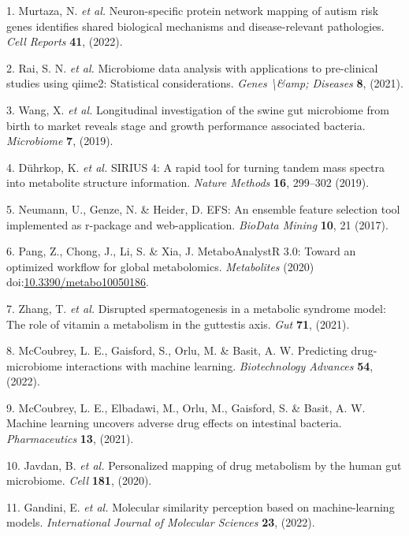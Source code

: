 \documentclass[
]{article}
\newenvironment{cslreferences}%
  {}%
  {\par}
\begin{document}
\hypertarget{refs}{}
\begin{cslreferences}
\leavevmode\hypertarget{ref-NeuronSpecificMurtaz2022}{}%
1. Murtaza, N. \emph{et al.} Neuron-specific protein network mapping of autism risk genes identifies shared biological mechanisms and disease-relevant pathologies. \emph{Cell Reports} \textbf{41}, (2022).

\leavevmode\hypertarget{ref-MicrobiomeDataRaiS2021}{}%
2. Rai, S. N. \emph{et al.} Microbiome data analysis with applications to pre-clinical studies using qiime2: Statistical considerations. \emph{Genes \textbackslash\&amp; Diseases} \textbf{8}, (2021).

\leavevmode\hypertarget{ref-LongitudinalInWang2019}{}%
3. Wang, X. \emph{et al.} Longitudinal investigation of the swine gut microbiome from birth to market reveals stage and growth performance associated bacteria. \emph{Microbiome} \textbf{7}, (2019).

\leavevmode\hypertarget{ref-Sirius4ARapDuhrko2019}{}%
4. Dührkop, K. \emph{et al.} SIRIUS 4: A rapid tool for turning tandem mass spectra into metabolite structure information. \emph{Nature Methods} \textbf{16}, 299--302 (2019).

\leavevmode\hypertarget{ref-EfsAnEnsemblNeuman2017}{}%
5. Neumann, U., Genze, N. \& Heider, D. EFS: An ensemble feature selection tool implemented as r-package and web-application. \emph{BioData Mining} \textbf{10}, 21 (2017).

\leavevmode\hypertarget{ref-MetaboanalystrPang2020}{}%
6. Pang, Z., Chong, J., Li, S. \& Xia, J. MetaboAnalystR 3.0: Toward an optimized workflow for global metabolomics. \emph{Metabolites} (2020) doi:\href{https://doi.org/10.3390/metabo10050186}{10.3390/metabo10050186}.

\leavevmode\hypertarget{ref-DisruptedSpermZhang2021}{}%
7. Zhang, T. \emph{et al.} Disrupted spermatogenesis in a metabolic syndrome model: The role of vitamin a metabolism in the guttestis axis. \emph{Gut} \textbf{71}, (2021).

\leavevmode\hypertarget{ref-PredictingDrugMccoub2022}{}%
8. McCoubrey, L. E., Gaisford, S., Orlu, M. \& Basit, A. W. Predicting drug-microbiome interactions with machine learning. \emph{Biotechnology Advances} \textbf{54}, (2022).

\leavevmode\hypertarget{ref-MachineLearninMccoub2021}{}%
9. McCoubrey, L. E., Elbadawi, M., Orlu, M., Gaisford, S. \& Basit, A. W. Machine learning uncovers adverse drug effects on intestinal bacteria. \emph{Pharmaceutics} \textbf{13}, (2021).

\leavevmode\hypertarget{ref-PersonalizedMaJavdan2020}{}%
10. Javdan, B. \emph{et al.} Personalized mapping of drug metabolism by the human gut microbiome. \emph{Cell} \textbf{181}, (2020).

\leavevmode\hypertarget{ref-MolecularSimilGandin2022}{}%
11. Gandini, E. \emph{et al.} Molecular similarity perception based on machine-learning models. \emph{International Journal of Molecular Sciences} \textbf{23}, (2022).
\end{cslreferences}
\end{document}
